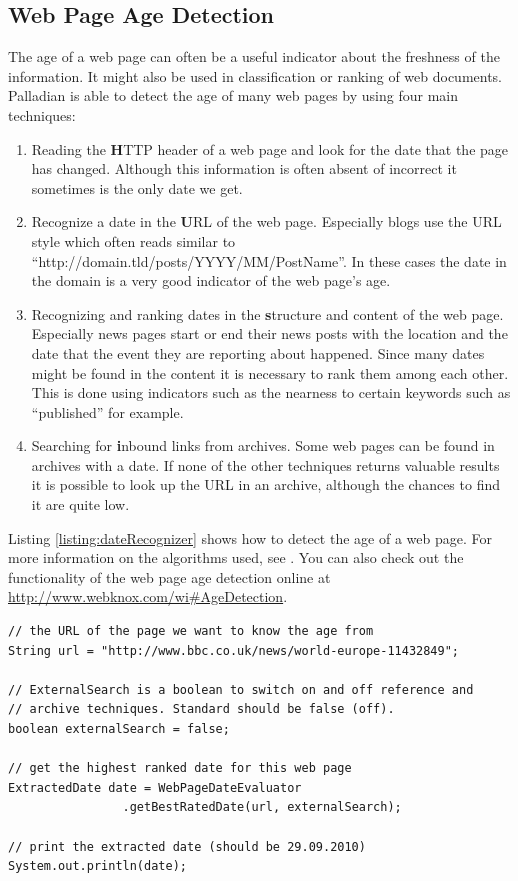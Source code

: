 \documentclass[a4paper,twoside]{book}      %
\begin{document}
\subsection{Web Page Age Detection}
The age of a web page can often be a useful indicator about the freshness of the information. It might also be used in classification or ranking of web documents. Palladian is able to detect the age of many web pages by using four main techniques:
\begin{enumerate}
\item Reading the {\textbf HTTP header} of a web page and look for the date that the page has changed. Although this information is often absent of incorrect it sometimes is the only date we get.
\item Recognize a date in the {\textbf URL} of the web page. Especially blogs use the URL style which often reads similar to ``http://domain.tld/posts/YYYY/MM/PostName''. In these cases the date in the domain is a very good indicator of the web page's age.
\item Recognizing and ranking dates in the {\textbf structure and content} of the web page. Especially news pages start or end their news posts with the location and the date that the event they are reporting about happened. Since many dates might be found in the content it is necessary to rank them among each other. This is done using indicators such as the nearness to certain keywords such as ``published'' for example.
\item Searching for {\textbf inbound links from archives}. Some web pages can be found in archives with a date. If none of the other techniques returns valuable results it is possible to look up the URL in an archive, although the chances to find it are quite low.
\end{enumerate}

Listing \ref{listing:dateRecognizer} shows how to detect the age of a web page. For more information on the algorithms used, see \cite{gregor2010bachelor}. You can also check out the functionality of the web page age detection online at \url{http://www.webknox.com/wi#AgeDetection}.

\begin{codelisting}
\begin{lstlisting}[label=listing:dateRecognizer,caption=Detecting the age of a web page.,frame=tb]
// the URL of the page we want to know the age from
String url = "http://www.bbc.co.uk/news/world-europe-11432849";

// ExternalSearch is a boolean to switch on and off reference and
// archive techniques. Standard should be false (off).
boolean externalSearch = false;

// get the highest ranked date for this web page
ExtractedDate date = WebPageDateEvaluator
				.getBestRatedDate(url, externalSearch);

// print the extracted date (should be 29.09.2010)
System.out.println(date);
\end{lstlisting}
\end{codelisting}
\end{document}
